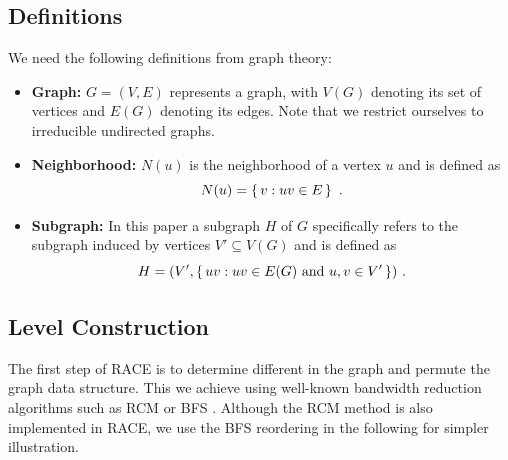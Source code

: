 \subsection*{Definitions}
We need the following definitions from graph theory:
\begin{itemize}
	\item \textbf{Graph: } $G = (V,E)$ represents a graph, with $V(G)$
              denoting its set of vertices and $E(G)$ denoting its edges. Note that
              we restrict ourselves to irreducible undirected graphs.
	\item \textbf{Neighborhood:} $N(u)$ is the neighborhood of a vertex $u$ and is defined as
	\begin{equation*}
	  N(u) = \set{ v : uv \in E}~.
	\end{equation*}
	\item \textbf{Subgraph:} In this paper a subgraph $H$ of $G$ specifically
              refers to the subgraph induced by vertices $V' \subseteq V(G)$ and is defined as
	\begin{equation*}
		H = (V', \set{ uv : uv \in E(G) \text{ and } u,v \in V'})~.
	\end{equation*}
\end{itemize}

\subsection{Level Construction}\label{subsec:LEVEL_CONST}

The first step of \acrshort{RACE} is to determine
different \textit{\levels} in the graph and permute the
graph data structure. This we achieve using
well-known bandwidth reduction algorithms such as \acrfull{RCM} \cite{RCM}
or \acrfull{BFS} \cite{BFS}\@. Although the RCM method is
also implemented in \acrshort{RACE}, we use the \acrshort{BFS}
reordering in the following for simpler illustration.



